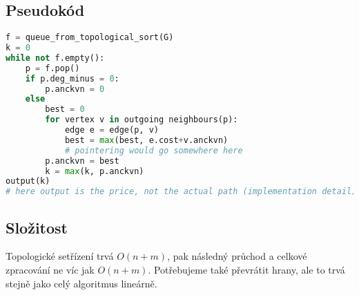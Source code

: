 \documentclass[a4paper]{article}
\begin{document}
\subsection{Pseudokód}
\begin{lstlisting}[language=Python]
f = queue_from_topological_sort(G)
k = 0
while not f.empty():
	p = f.pop()
	if p.deg_minus = 0:
		p.anckvn = 0
	else
		best = 0
		for vertex v in outgoing neighbours(p):
			edge e = edge(p, v)
			best = max(best, e.cost+v.anckvn)
			# pointering would go somewhere here
		p.anckvn = best
		k = max(k, p.anckvn)
output(k)
# here output is the price, not the actual path (implementation detail)
\end{lstlisting}

\subsection{Složitost}
Topologické setřízení trvá $O(n+m)$, pak následný průchod a celkové zpracování ne víc jak $O(n+m)$. Potřebujeme také převrátit hrany, ale to trvá stejně jako celý algoritmus lineárně.
\end{document}
